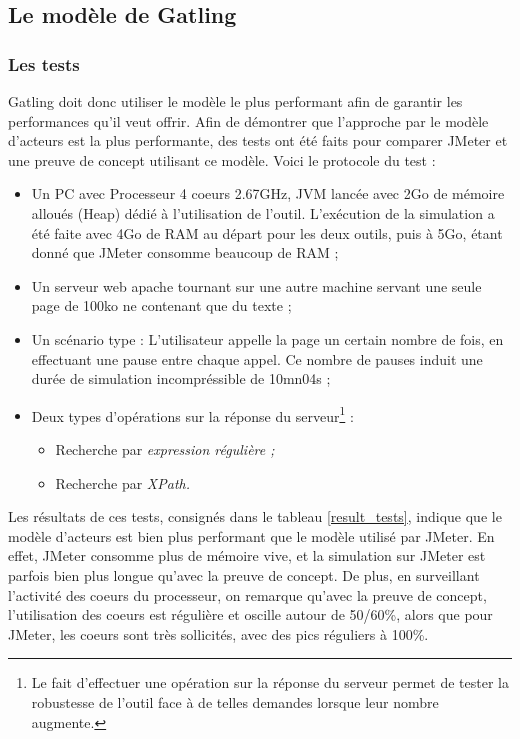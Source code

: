 \subsection{Le modèle de Gatling}
\subsubsection{Les tests}
Gatling doit donc utiliser le modèle le plus performant afin de garantir les performances qu'il veut offrir. Afin de démontrer que l'approche par le modèle d'acteurs est la plus performante, des tests ont été faits pour comparer JMeter et une preuve de concept utilisant ce modèle. Voici le protocole du test :

\begin{itemize}
  \item Un PC avec Processeur 4 coeurs 2.67GHz, JVM lancée avec 2Go de mémoire alloués (Heap) dédié à l'utilisation de l'outil. L'exécution de la simulation a été faite avec 4Go de RAM au départ pour les deux outils, puis à 5Go, étant donné que JMeter consomme beaucoup de RAM ;
  \item Un serveur web apache tournant sur une autre machine servant une seule page de 100ko ne contenant que du texte ;
  \item Un scénario type : L'utilisateur appelle la page un certain nombre de fois, en effectuant une pause entre chaque appel. Ce nombre de pauses induit une durée de simulation incompréssible de 10mn04s ;
  \item Deux types d'opérations sur la réponse du serveur\footnote{Le fait d'effectuer une opération sur la réponse du serveur permet de tester la robustesse de l'outil face à de telles demandes lorsque leur nombre augmente.} :
  \begin{itemize}
    \item Recherche par \em{expression régulière} ;
    \item Recherche par \em{XPath}.
  \end{itemize}
\end{itemize}

Les résultats de ces tests, consignés dans le tableau \ref{result_tests}, indique que le modèle d'acteurs est bien plus performant que le modèle utilisé par JMeter. En effet, JMeter consomme plus de mémoire vive, et la simulation sur JMeter est parfois bien plus longue qu'avec la preuve de concept. De plus, en surveillant l'activité des coeurs du processeur, on remarque qu'avec la preuve de concept, l'utilisation des coeurs est régulière et oscille autour de 50/60\%, alors que pour JMeter, les coeurs sont très sollicités, avec des pics réguliers à 100\%.

